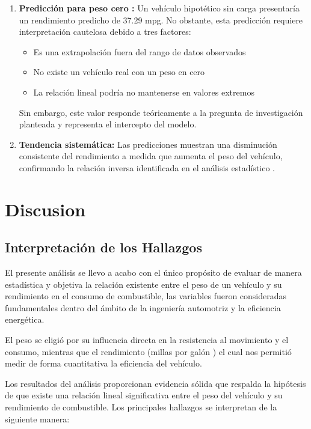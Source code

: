 \documentclass[12pt, letterpaper]{article}
\begin{document}
    \begin{enumerate}
        \item \textbf{Predicción para peso cero :}
        Un vehículo hipotético sin carga presentaría  un rendimiento predicho de 37.29 mpg.
        No obstante, esta predicción requiere interpretación cautelosa debido a  tres factores:
        \begin{itemize}
            \item Es una extrapolación fuera del rango de datos observados
            \item No existe un vehículo real con un peso en cero
            \item La relación lineal podría no mantenerse en valores extremos
        \end{itemize}
        Sin embargo, este valor responde teóricamente a la pregunta de investigación planteada y
        representa el intercepto del modelo.

        \item \textbf{Tendencia sistemática:} Las predicciones muestran una disminución
        consistente del rendimiento a medida que  aumenta el peso del vehículo, confirmando la relación
        inversa identificada en el análisis estadístico .

    \end{enumerate}

      \section{Discusion}

    \subsection{Interpretación de los Hallazgos}

El presente análisis se llevo a acabo con el único propósito de evaluar de manera estadística y objetiva la relación existente entre el peso de un vehículo y su rendimiento en el consumo de combustible, las variables fueron consideradas fundamentales dentro del ámbito de la ingeniería automotriz y la eficiencia energética. 

El peso se eligió por su influencia directa en la resistencia al movimiento y el consumo, mientras que el rendimiento (millas por galón ) el cual nos permitió medir de forma cuantitativa la eficiencia del vehículo. 

    Los resultados del análisis proporcionan evidencia sólida que respalda la hipótesis
    de que existe una relación lineal significativa entre el peso del vehículo y
    su rendimiento de combustible. Los principales hallazgos se interpretan de la
    siguiente manera:
\end{document}

